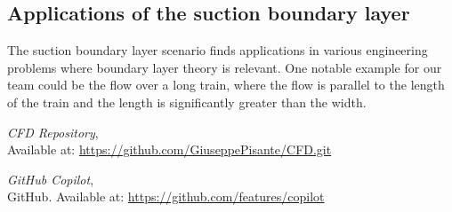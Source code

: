 \documentclass{article}
\begin{document}
\subsection{Applications of the suction boundary layer}
The suction boundary layer scenario finds applications in various engineering problems where boundary layer theory is relevant. One notable example for our team could be the flow over a long train, where the flow is parallel to the length of the train and the length is significantly greater than the width. 

\begin{thebibliography}{9}
    \textit{CFD Repository},\\
    Available at: \url{https://github.com/GiuseppePisante/CFD.git}
    
    \textit{GitHub Copilot},\\
    GitHub. Available at: \url{https://github.com/features/copilot}
    \end{thebibliography}
\end{document}
